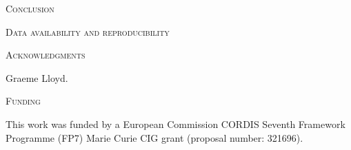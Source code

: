 \documentclass[12pt,letterpaper]{article}
\renewcommand{\section}[1]{%
\bigskip
\begin{center}
\begin{Large}
\normalfont\scshape #1
\medskip
\end{Large}
\end{center}}
\begin{document}
\section{Conclusion}



\section{Data availability and reproducibility}

\section{Acknowledgments}
Graeme Lloyd. 

\section{Funding}
This work was funded by a European Commission CORDIS Seventh Framework Programme (FP7) Marie Curie CIG grant (proposal number: 321696).



\end{document}
